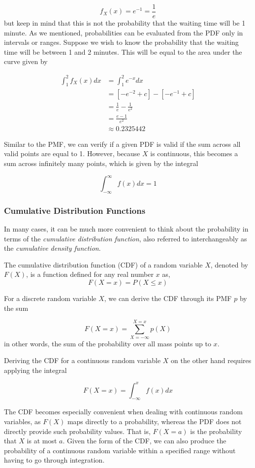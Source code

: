 \documentclass{article}
\begin{document}
$$
f_X(x) = e^{-1} = \frac{1}{e}
$$
but keep in mind that this is not the probability that the waiting time will be 1 minute. As we mentioned, probabilities can be evaluated from the PDF only in intervals or ranges. Suppose we wish to know the probability that the waiting time will be between 1 and 2 minutes. This will be equal to the area under the curve given by

$$
\begin{aligned}
\int^{2}_{1}{f_X(x)dx} &= \int^{2}_{1}{e^{-x}dx} \\
& = [-e^{-2} + c] - [-e^{-1} + c] \\
& = \frac{1}{e} - \frac{1}{e^2} \\
& = \frac{e - 1}{e^2} \\
& \approx 0.2325442
\end{aligned}
$$

Similar to the PMF, we can verify if a given PDF is valid if the sum across all valid points are equal to 1. However, because $X$ is continuous, this becomes a sum across infinitely many points, which is given by the integral

$$
\int^{\infty}_{-\infty}{f(x)dx} = 1
$$

\subsubsection{Cumulative Distribution Functions}

In many cases, it can be much more convenient to think about the probability in terms of the \emph{cumulative distribution function}, also referred to interchangeably as the \emph{cumulative density function}.

The cumulative distribution function (CDF) of a random variable $X$, denoted by $F(X)$, is a function defined for any real number $x$ as,
$$
F(X=x)=P(X \leq x)
$$

For a discrete random variable $X$, we can derive the CDF through its PMF $p$ by the sum

$$
F(X = x) = \sum^{X = x}_{X = -\infty}p(X)
$$
in other words, the sum of the probability over all mass points up to $x$.

Deriving the CDF for a continuous random variable $X$ on the other hand requires applying the integral

$$
F(X = x) = \int^{x}_{-\infty}f(x)dx
$$

The CDF becomes especially convenient when dealing with continuous random variables, as $F(X)$ maps directly to a probability, whereas the PDF does not directly provide such probability values. That is, $F(X = a)$ is the probability that $X$ is at most $a$. Given the form of the CDF, we can also produce the probability of a continuous random variable within a specified range without having to go through integration.
\end{document}

